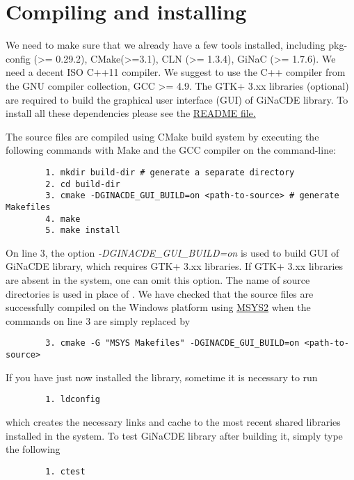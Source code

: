 \documentclass[prd,aps,floats,showkeys,nofootinbib,notitlepage]{revtex4-2}
\begin{document}
	
	\section{Compiling and installing}\label{sec:compile}
	We need to make sure that we already have a few tools installed, including pkg-config (>= 0.29.2), CMake(>=3.1), CLN (>= 1.3.4), GiNaC (>= 1.7.6). We need a decent ISO C++11 compiler. We suggest to use the C++ compiler from the GNU compiler collection, GCC >= 4.9. The GTK+ 3.xx libraries (optional) are required to build the graphical user interface (GUI) of GiNaCDE library. To install all these dependencies please see the \href{https://github.com/mithun218/GiNaCDE/tree/master#readme}{README file.} 
	
	The source files are compiled using CMake build system by executing the following commands with Make and the GCC compiler on the command-line:
	\begin{verbatim}
		1. mkdir build-dir # generate a separate directory
		2. cd build-dir
		3. cmake -DGINACDE_GUI_BUILD=on <path-to-source> # generate Makefiles
		4. make
		5. make install
	\end{verbatim}
	On line 3, the option {\em -DGINACDE\_GUI\_BUILD=on} is used to build GUI of GiNaCDE library, which requires GTK+ 3.xx libraries. If GTK+ 3.xx libraries are absent in the system, one can omit this option. The name of source directories is used in place of {\em <path-to-source>}. We have checked that the source files are successfully compiled on the Windows platform using \href{https://www.msys2.org}{MSYS2} when the commands on line 3 are simply replaced by
	\begin{verbatim}
		3. cmake -G "MSYS Makefiles" -DGINACDE_GUI_BUILD=on <path-to-source>
	\end{verbatim}
	If you have just now installed the library, sometime it is necessary to run
	\begin{verbatim}
		1. ldconfig
	\end{verbatim}
	which creates the necessary links and cache to the most recent shared libraries installed in the system.
	To test GiNaCDE library after building it, simply type the following
	\begin{verbatim}
		1. ctest
	\end{verbatim}
	
\end{document}
